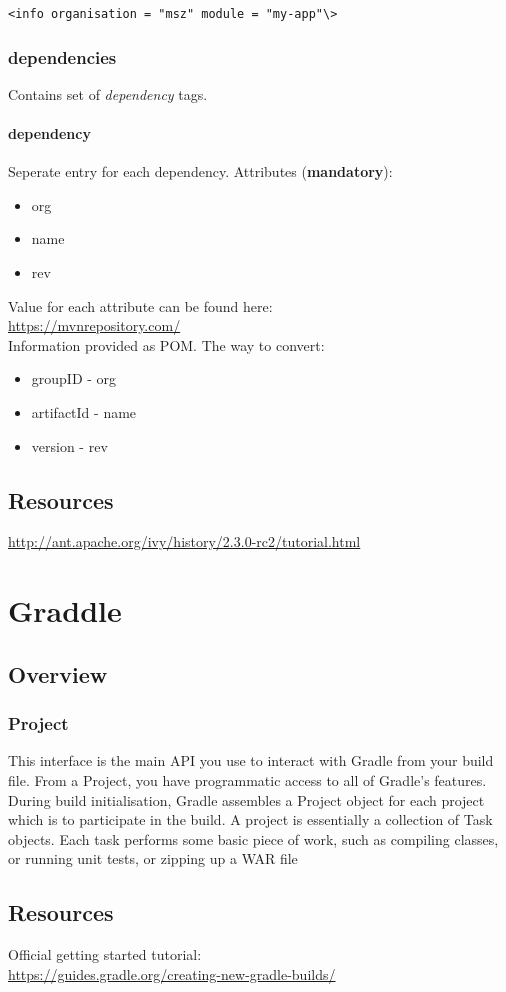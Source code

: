 \documentclass{report}
\begin{document}
\begin{verbatim}
<info organisation = "msz" module = "my-app"\>
\end{verbatim}

\section{dependencies}

Contains set of \textit{dependency} tags.

\subsection{dependency}
Seperate entry for each dependency. Attributes (\textbf{mandatory}):
\begin{itemize}
  \item org
  \item name
  \item rev
\end{itemize}
Value for each attribute can be found here:\\
\url{https://mvnrepository.com/}\\
Information provided as POM. The way to convert:
\begin{itemize}
  \item groupID - org
  \item artifactId - name
  \item version - rev
\end{itemize}




\chapter{Resources}

\url{http://ant.apache.org/ivy/history/2.3.0-rc2/tutorial.html}




\part{Graddle}



\chapter{Overview}

\section{Project}
This interface is the main API you use to interact with Gradle
from your build file. From a Project, you have programmatic access 
to all of Gradle's features. During build initialisation, Gradle assembles a
Project object for each project which is to participate in the build.
A project is essentially a collection of Task objects. Each task performs some
basic piece of work, such as compiling classes, or running unit tests, or zipping up a WAR file



\chapter{Resources}
Official getting started tutorial:\\
\url{https://guides.gradle.org/creating-new-gradle-builds/}
\end{document}
